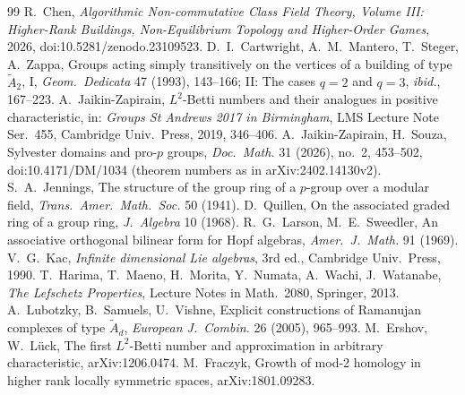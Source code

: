 \documentclass[11pt]{amsart}
\theoremstyle{definition}
\begin{document}
\begin{thebibliography}{99}
 R.~Chen, \emph{Algorithmic Non-commutative Class Field Theory, Volume III: Higher-Rank Buildings,
Non-Equilibrium Topology and Higher-Order Games}, 2026, doi:10.5281/zenodo.23109523.
 D.~I.~Cartwright, A.~M.~Mantero, T.~Steger, A.~Zappa, Groups acting simply transitively on the vertices
of a building of type $\tilde A_2$, I, \emph{Geom.\ Dedicata} 47 (1993), 143--166; II: The cases $q=2$ and $q=3$,
\emph{ibid.}, 167--223.
 A.~Jaikin-Zapirain, $L^2$-Betti numbers and their analogues in positive characteristic, in:
\emph{Groups St Andrews 2017 in Birmingham}, LMS Lecture Note Ser.\ 455, Cambridge Univ.\ Press, 2019, 346--406.
 A.~Jaikin-Zapirain, H.~Souza, Sylvester domains and pro-$p$ groups, \emph{Doc.\ Math.} 31 (2026), no.~2, 453--502, doi:10.4171/DM/1034 (theorem numbers as in arXiv:2402.14130v2).
 S.~A.~Jennings, The structure of the group ring of a $p$-group over a modular field,
\emph{Trans.\ Amer.\ Math.\ Soc.} 50 (1941).
 D.~Quillen, On the associated graded ring of a group ring, \emph{J.\ Algebra} 10 (1968).
 R.~G.~Larson, M.~E.~Sweedler, An associative orthogonal bilinear form for Hopf algebras,
\emph{Amer.\ J.\ Math.} 91 (1969).
 V.~G.~Kac, \emph{Infinite dimensional Lie algebras}, 3rd ed., Cambridge Univ.\ Press, 1990.
 T.~Harima, T.~Maeno, H.~Morita, Y.~Numata, A.~Wachi, J.~Watanabe, \emph{The Lefschetz Properties},
Lecture Notes in Math.\ 2080, Springer, 2013.
 A.~Lubotzky, B.~Samuels, U.~Vishne, Explicit constructions of Ramanujan complexes of type $\tilde A_d$,
\emph{European J.\ Combin.} 26 (2005), 965--993.
 M.~Ershov, W.~L\"uck, The first $L^2$-Betti number and approximation in arbitrary characteristic,
arXiv:1206.0474.
 M.~Fraczyk, Growth of mod-2 homology in higher rank locally symmetric spaces, arXiv:1801.09283.
\end{thebibliography}
\end{document}
